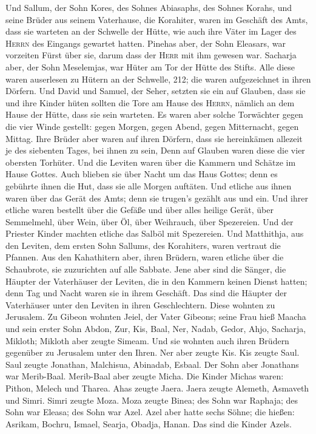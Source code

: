  Und Sallum, der Sohn Kores, des Sohnes Abiasaphs, des
Sohnes Korahs, und seine Brüder aus seinem Vaterhause, die Korahiter,
waren im Geschäft des Amts, dass sie warteten an der Schwelle der Hütte,
wie auch ihre Väter im Lager des \textsc{Herrn} des Eingangs gewartet
hatten.  Pinehas aber, der Sohn Eleasars, war vorzeiten
Fürst über sie, darum dass der \textsc{Herr} mit ihm gewesen war.
 Sacharja aber, der Sohn Meselemjas, war Hüter am Tor der
Hütte des Stifts.  Alle diese waren auserlesen zu Hütern
an der Schwelle, 212; die waren aufgezeichnet in ihren Dörfern. Und
David und Samuel, der Seher, setzten sie ein auf Glauben,
 dass sie und ihre Kinder hüten sollten die Tore am Hause
des \textsc{Herrn}, nämlich an dem Hause der Hütte, dass sie sein
warteten.  Es waren aber solche Torwächter gegen die vier
Winde gestellt: gegen Morgen, gegen Abend, gegen Mitternacht, gegen
Mittag.  Ihre Brüder aber waren auf ihren Dörfern, dass
sie hereinkämen allezeit je des siebenten Tages, bei ihnen zu sein,
 Denn auf Glauben waren diese die vier obersten Torhüter.
Und die Leviten waren über die Kammern und Schätze im Hause Gottes.
 Auch blieben sie über Nacht um das Haus Gottes; denn es
gebührte ihnen die Hut, dass sie alle Morgen auftäten. 
Und etliche aus ihnen waren über das Gerät des Amts; denn sie trugen's
gezählt aus und ein.  Und ihrer etliche waren bestellt
über die Gefäße und über alles heilige Gerät, über Semmelmehl, über
Wein, über Öl, über Weihrauch, über Spezereien.  Und der
Priester Kinder machten etliche das Salböl mit Spezereien.
 Und Matthithja, aus den Leviten, dem ersten Sohn
Sallums, des Korahiters, waren vertraut die Pfannen.  Aus
den Kahathitern aber, ihren Brüdern, waren etliche über die Schaubrote,
sie zuzurichten auf alle Sabbate.  Jene aber sind die
Sänger, die Häupter der Vaterhäuser der Leviten, die in den Kammern
keinen Dienst hatten; denn Tag und Nacht waren sie in ihrem Geschäft.
 Das sind die Häupter der Vaterhäuser unter den Leviten
in ihren Geschlechtern. Diese wohnten zu Jerusalem.  Zu
Gibeon wohnten Jeiel, der Vater Gibeons; seine Frau hieß Maacha
 und sein erster Sohn Abdon, Zur, Kis, Baal, Ner, Nadab,
 Gedor, Ahjo, Sacharja, Mikloth;  Mikloth
aber zeugte Simeam. Und sie wohnten auch ihren Brüdern gegenüber zu
Jerusalem unter den Ihren.  Ner aber zeugte Kis. Kis
zeugte Saul. Saul zeugte Jonathan, Malchisua, Abinadab, Esbaal.
 Der Sohn aber Jonathans war Merib-Baal. Merib-Baal aber
zeugte Micha.  Die Kinder Michas waren: Pithon, Melech
und Tharea.  Ahas zeugte Jaera. Jaera zeugte Alemeth,
Asmaveth und Simri. Simri zeugte Moza.  Moza zeugte
Binea; des Sohn war Raphaja; des Sohn war Eleasa; des Sohn war Azel.
 Azel aber hatte sechs Söhne; die hießen: Asrikam,
Bochru, Ismael, Searja, Obadja, Hanan. Das sind die Kinder Azels.

